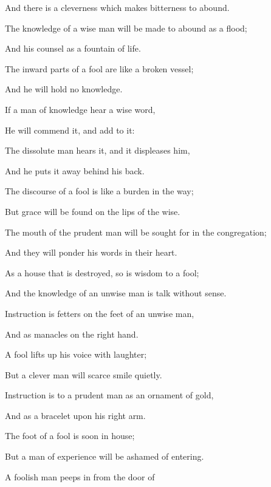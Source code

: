 {\par }{\Q And there is a cleverness which makes bitterness to abound.
\par }{\Q {}The knowledge of a wise man will be made to abound as a flood;
\par }{\Q And his counsel as a fountain of life.
\par }{\Q {}The inward parts of a fool are like a broken vessel;
\par }{\Q And he will hold no knowledge.
\par }{\BB \par }{\Q {}If a man of knowledge hear a wise word,
\par }{\Q He will commend it, and add to it:
\par }{\Q The dissolute man hears it, and it displeases him,
\par }{\Q And he puts it away behind his back.
\par }{\Q {}The discourse of a fool is like a burden in the way;
\par }{\Q But grace will be found on the lips of the wise.
\par }{\Q {}The mouth of the prudent man will be sought for in the congregation;
\par }{\Q And they will ponder his words in their heart.
\par }{\BB \par }{\Q {}As a house that is destroyed, so is wisdom to a fool;
\par }{\Q And the knowledge of an unwise man is
{}
 talk without sense.
\par }{\Q {}Instruction is
{} fetters on the feet of an unwise man,
\par }{\Q And as manacles on the right hand.
\par }{\Q {}A fool lifts up his voice with laughter;
\par }{\Q But a clever man will scarce smile quietly.
\par }{\Q {}Instruction is to a prudent man as an ornament of gold,
\par }{\Q And as a bracelet upon his right arm.
\par }{\BB \par }{\Q {}The foot of a fool is soon in
{} house;
\par }{\Q But a man of experience will be ashamed of entering.
\par }{\Q {}A foolish man peeps in from the door of
}
